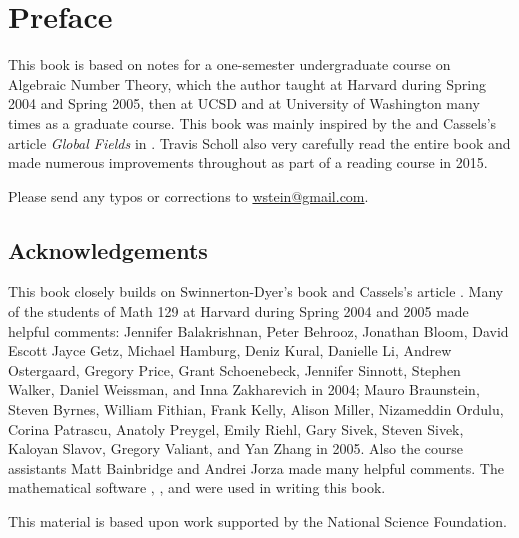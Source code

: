 
\chapter{Preface}

This book is based on notes for a one-semester
undergraduate course on Algebraic Number Theory, which the author
taught at Harvard during Spring 2004 and Spring 2005, then at UCSD
and at University of Washington many times as a graduate course.
This book was mainly inspired by the \cite[Ch.~1]{sd:brief} and
Cassels's article {\em Global Fields} in \cite{cassels:global}.
Travis Scholl also very carefully read the entire book and made
numerous improvements throughout as part of a
reading course in 2015.

Please send any typos or corrections to \url{wstein@gmail.com}.

\section*{Acknowledgements}

This book closely builds on
Swinnerton-Dyer's book \cite{sd:brief} and Cassels's article
\cite{cassels:global}. Many of the students of Math 129 at Harvard
during Spring 2004 and 2005 made helpful comments: Jennifer
Balakrishnan, Peter Behrooz, Jonathan Bloom, David Escott Jayce Getz,
Michael Hamburg, Deniz Kural, Danielle Li, Andrew Ostergaard, Gregory
Price, Grant Schoenebeck, Jennifer Sinnott, Stephen Walker, Daniel
Weissman, and Inna Zakharevich in 2004; Mauro Braunstein, Steven
Byrnes, William Fithian, Frank Kelly, Alison Miller, Nizameddin
Ordulu, Corina Patrascu, Anatoly Preygel, Emily Riehl, Gary Sivek,
Steven Sivek, Kaloyan Slavov, Gregory Valiant, and Yan Zhang in 2005.
Also the course assistants Matt Bainbridge and Andrei Jorza made many
helpful comments.  The mathematical software \cite{sage}, \cite{pari},
and \cite{magma} were used in writing this book.

This material is based upon work supported by the National Science
Foundation.
